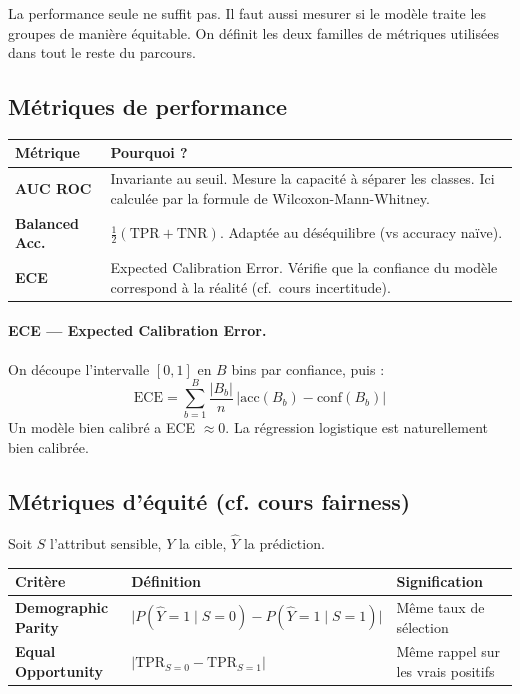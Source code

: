 \documentclass[11pt, a4paper]{article}
\begin{document}
\begin{questionbox}
La performance seule ne suffit pas. Il faut aussi mesurer si le mod\`{e}le traite les groupes de mani\`{e}re \'{e}quitable. On d\'{e}finit les deux familles de m\'{e}triques utilis\'{e}es dans tout le reste du parcours.
\end{questionbox}

\subsection{M\'{e}triques de performance}

\begin{table}[H]
\centering
\begin{tabular}{lp{9cm}}
\toprule
\textbf{M\'{e}trique} & \textbf{Pourquoi ?} \\
\midrule
\textbf{AUC ROC} & Invariante au seuil. Mesure la capacit\'{e} \`{a} s\'{e}parer les classes. Ici calcul\'{e}e par la formule de Wilcoxon-Mann-Whitney. \\
\textbf{Balanced Acc.} & $\frac{1}{2}(\text{TPR}+\text{TNR})$. Adapt\'{e}e au d\'{e}s\'{e}quilibre (vs accuracy na\"{i}ve). \\
\textbf{ECE} & Expected Calibration Error. V\'{e}rifie que la confiance du mod\`{e}le correspond \`{a} la r\'{e}alit\'{e} (cf.~cours incertitude). \\
\bottomrule
\end{tabular}
\end{table}

\paragraph{ECE --- Expected Calibration Error.}
On d\'{e}coupe l'intervalle $[0,1]$ en $B$ bins par confiance, puis :
$$\text{ECE} = \sum_{b=1}^{B} \frac{|B_b|}{n}\, \big|\text{acc}(B_b) - \text{conf}(B_b)\big|$$
Un mod\`{e}le bien calibr\'{e} a ECE $\approx 0$. La r\'{e}gression logistique est naturellement bien calibr\'{e}e.

\subsection{M\'{e}triques d'\'{e}quit\'{e} (cf. cours fairness)}

Soit $S$ l'attribut sensible, $Y$ la cible, $\hat{Y}$ la pr\'{e}diction.

\begin{table}[H]
\centering
\begin{tabular}{lll}
\toprule
\textbf{Crit\`{e}re} & \textbf{D\'{e}finition} & \textbf{Signification} \\
\midrule
\textbf{Demographic Parity} & $\big|P(\hat{Y}{=}1 \mid S{=}0) - P(\hat{Y}{=}1 \mid S{=}1)\big|$ & M\^{e}me taux de s\'{e}lection \\
\textbf{Equal Opportunity} & $\big|\text{TPR}_{S=0} - \text{TPR}_{S=1}\big|$ & M\^{e}me rappel sur les vrais positifs \\
\bottomrule
\end{tabular}
\end{table}
\end{document}
